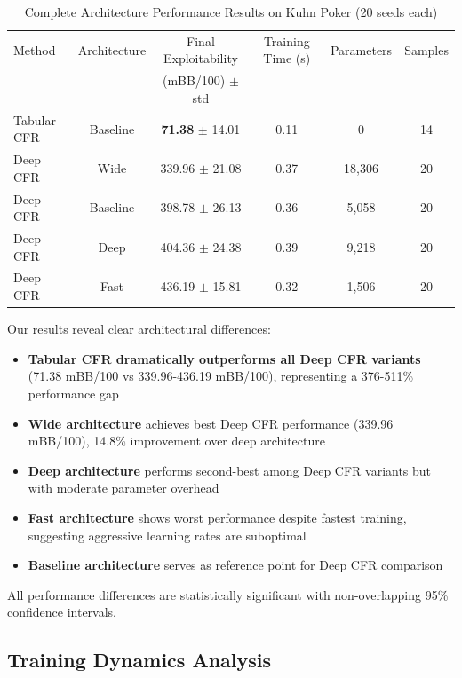 \documentclass{article}
\begin{document}
\begin{table}[h]
\centering
\caption{Complete Architecture Performance Results on Kuhn Poker (20 seeds each)}
\label{tab:performance_results}
\begin{tabular}{lccccc}
\toprule
Method & Architecture & Final Exploitability & Training Time (s) & Parameters & Samples \\
& & (mBB/100) $\pm$ std & & & \\
\midrule
Tabular CFR & Baseline & \textbf{71.38} $\pm$ 14.01 & 0.11 & 0 & 14 \\
Deep CFR & Wide & 339.96 $\pm$ 21.08 & 0.37 & 18,306 & 20 \\
Deep CFR & Baseline & 398.78 $\pm$ 26.13 & 0.36 & 5,058 & 20 \\
Deep CFR & Deep & 404.36 $\pm$ 24.38 & 0.39 & 9,218 & 20 \\
Deep CFR & Fast & 436.19 $\pm$ 15.81 & 0.32 & 1,506 & 20 \\
\bottomrule
\end{tabular}
\end{table}

Our results reveal clear architectural differences:

\begin{itemize}
\item \textbf{Tabular CFR dramatically outperforms all Deep CFR variants} (71.38 mBB/100 vs 339.96-436.19 mBB/100), representing a 376-511\% performance gap
\item \textbf{Wide architecture} achieves best Deep CFR performance (339.96 mBB/100), 14.8\% improvement over deep architecture
\item \textbf{Deep architecture} performs second-best among Deep CFR variants but with moderate parameter overhead
\item \textbf{Fast architecture} shows worst performance despite fastest training, suggesting aggressive learning rates are suboptimal
\item \textbf{Baseline architecture} serves as reference point for Deep CFR comparison
\end{itemize}

All performance differences are statistically significant with non-overlapping 95\% confidence intervals.

\subsection{Training Dynamics Analysis}
\end{document}
